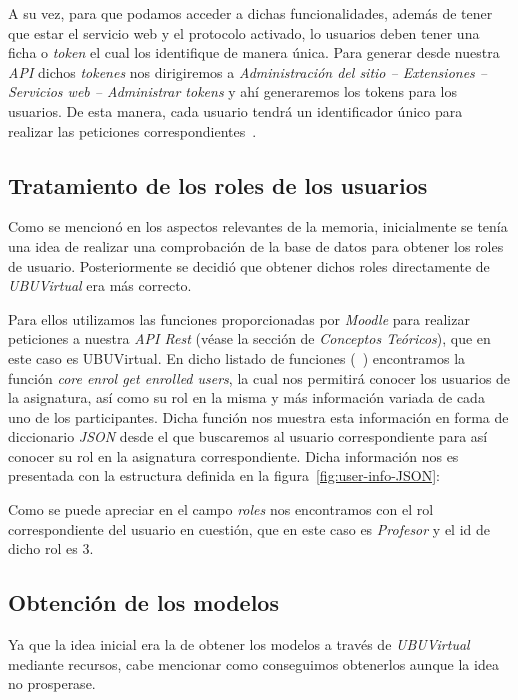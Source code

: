 A su vez, para que podamos acceder a dichas funcionalidades, además de tener que estar el servicio web y el protocolo activado, lo usuarios deben tener una ficha o \textit{token} el cual los identifique de manera única. Para generar desde nuestra \textit{API} dichos \textit{tokenes} nos dirigiremos a \textit{Administración del sitio -- Extensiones -- Servicios web -- Administrar tokens} y ahí generaremos los tokens para los usuarios. De esta manera, cada usuario tendrá un identificador único para realizar las peticiones correspondientes~\cite{moodle:api-rest-config}.

\subsection{Tratamiento de los roles de los usuarios}
Como se mencionó en los aspectos relevantes de la memoria, inicialmente se tenía una idea de realizar una comprobación de la base de datos para obtener los roles de usuario. Posteriormente se decidió que obtener dichos roles directamente de \textit{UBUVirtual} era más correcto.

Para ellos utilizamos las funciones proporcionadas por \textit{Moodle} para realizar peticiones a nuestra \textit{API Rest} (véase la sección de \textit{Conceptos Teóricos}), que en este caso es UBUVirtual. En dicho listado de funciones (~\cite{moodle:web-service-api-functions}) encontramos la función \textit{core enrol get enrolled users}, la cual nos permitirá conocer los usuarios de la asignatura, así como su rol en la misma y más información variada de cada uno de los participantes. Dicha función nos muestra esta información en forma de diccionario \textit{JSON} desde el que buscaremos al usuario correspondiente para así conocer su rol en la asignatura correspondiente. Dicha información nos es presentada con la estructura definida en la figura~\ref{fig:user-info-JSON}:

Como se puede apreciar en el campo \textit{roles} nos encontramos con el rol correspondiente del usuario en cuestión, que en este caso es \textit{Profesor} y el id de dicho rol es $3$.

\subsection{Obtención de los modelos}
Ya que la idea inicial era la de obtener los modelos a través de \textit{UBUVirtual} mediante recursos, cabe mencionar como conseguimos obtenerlos aunque la idea no prosperase.

